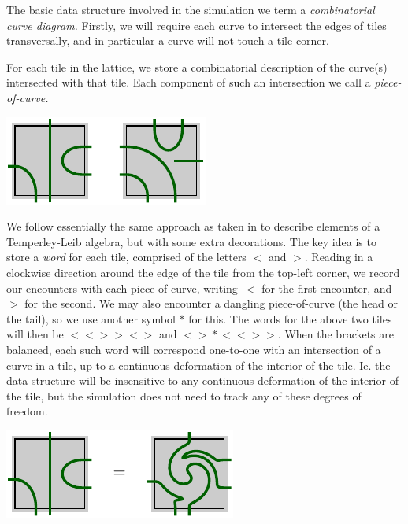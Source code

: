 \documentclass[aps, prl, letterpaper, twocolumn, superscriptaddress, notitlepage, 10pt]{revtex4-1}
\begin{document}
The basic data structure involved in the
simulation we term a \emph{combinatorial curve diagram.}
Firstly, we will require each curve to intersect 
the edges of tiles transversally,
and in particular a curve will not touch a tile corner.

For each tile in the lattice,
we store a combinatorial
description of the curve(s) intersected with that tile.
Each component of such an intersection we call a \emph{piece-of-curve.}
\begin{center}
\includegraphics[]{pic-cells.pdf}
\end{center}

We follow essentially the same approach as taken in \cite{Abramsky2007} 
to describe elements of a Temperley-Leib algebra, but
with some extra decorations.
The key idea is to store a \emph{word} for each tile, comprised of
the letters $\bigl<$ and $\bigr>$.
Reading in a clockwise direction around the edge of
the tile from the top-left corner,
we record our encounters with each piece-of-curve,
writing~$\bigl<$ for the first encounter, and~$\bigr>$ for the
second.
We may also encounter a dangling piece-of-curve
(the head or the tail), so we use another symbol $*$ for this.
The words for the above two tiles will then be 
$\bigl<\bigl<\bigr>\bigr>\bigl<\bigr>$ and $\bigl<\bigr>*\bigl<\bigl<\bigr>\bigr>.$
When the brackets are balanced,
each such word will correspond one-to-one with an intersection
of a curve in a tile, up to a continuous deformation of the interior of the tile.
Ie. the data structure 
will be insensitive to any continuous deformation of the interior of the tile,
but the simulation does not need to track any of these degrees of freedom.

\begin{center}
\includegraphics[]{pic-cells-0.pdf}
\end{center}
\end{document}
